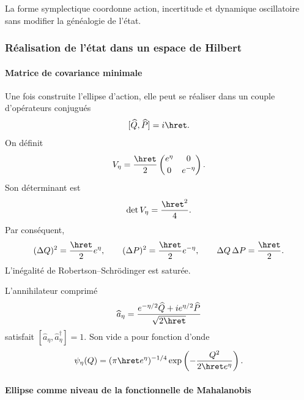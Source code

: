 \noindent La forme symplectique coordonne action, incertitude et dynamique oscillatoire sans modifier la généalogie de l'état.\par\medskip

\subsubsection{Réalisation de l'état dans un espace de Hilbert}

\paragraph{Matrice de covariance minimale}

Une fois construite l'ellipse d'action, elle peut se réaliser dans un couple
d'opérateurs conjugués
\[
[\widehat Q,\widehat P]=i\hret.
\]
On définit
\begin{equation}
V_\eta=\frac{\hret}{2}
\begin{pmatrix}
e^\eta&0\\[2pt]0&e^{-\eta}
\end{pmatrix}.
\label{eq:covariance}
\end{equation}
Son déterminant est
\begin{equation}
\det V_\eta=\frac{\hret^2}{4}.
\label{eq:cov-det}
\end{equation}
Par conséquent,
\begin{equation}
(\Delta Q)^2=\frac{\hret}{2}e^\eta,
\qquad
(\Delta P)^2=\frac{\hret}{2}e^{-\eta},
\qquad
\Delta Q\,\Delta P=\frac{\hret}{2}.
\label{eq:uncertainty}
\end{equation}
L'inégalité de Robertson--Schrödinger est saturée.

L'annihilateur comprimé
\begin{equation}
\widehat a_\eta=
\frac{e^{-\eta/2}\widehat Q+i e^{\eta/2}\widehat P}
{\sqrt{2\hret}}
\label{eq:a-eta}
\end{equation}
satisfait \([\widehat a_\eta,\widehat a_\eta^\dagger]=1\). Son vide a pour
fonction d'onde
\begin{equation}
\psi_\eta(Q)=
(\pi\hret e^\eta)^{-1/4}
\exp\left(-\frac{Q^2}{2\hret e^\eta}\right).
\label{eq:gaussian}
\end{equation}

\paragraph{Ellipse comme niveau de la fonctionnelle de Mahalanobis}

